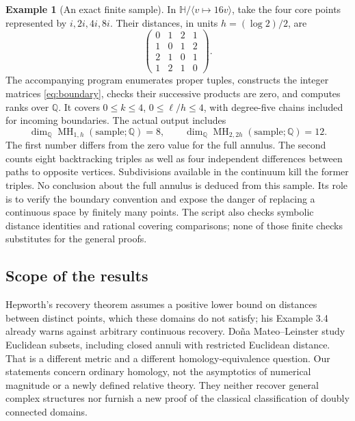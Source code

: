 \documentclass[12pt]{amsart}
\theoremstyle{definition}
\newtheorem{eg}[thm]{Example}
\theoremstyle{remark}
\numberwithin{equation}{section}
\newcommand{\Q}{\mathbb{Q}}
\DeclareMathOperator{\MH}{MH}
\begin{document}
\begin{eg}[An exact finite sample]\label{eg:finite}
In $\mathbb H/\langle v\mapsto16v\rangle$, take the four core points represented by $i,2i,4i,8i$. Their distances, in units $h=(\log2)/2$, are
\[
 \begin{pmatrix}0&1&2&1\\1&0&1&2\\2&1&0&1\\1&2&1&0\end{pmatrix}.
\]
The accompanying program enumerates proper tuples, constructs the integer matrices \eqref{eq:boundary}, checks their successive products are zero, and computes ranks over $\Q$. It covers $0\le k\le4$, $0\le\ell/h\le4$, with degree-five chains included for incoming boundaries. The actual output includes
\[
 \dim_{\Q}\MH_{1,h}(\text{sample};\Q)=8,\qquad
 \dim_{\Q}\MH_{2,2h}(\text{sample};\Q)=12.
\]
The first number differs from the zero value for the full annulus. The second counts eight backtracking triples as well as four independent differences between paths to opposite vertices. Subdivisions available in the continuum kill the former triples. No conclusion about the full annulus is deduced from this sample. Its role is to verify the boundary convention and expose the danger of replacing a continuous space by finitely many points. The script also checks symbolic distance identities and rational covering comparisons; none of those finite checks substitutes for the general proofs.
\end{eg}

\subsection*{Scope of the results}
Hepworth's recovery theorem \cite[Theorem 3.1]{Hepworth} assumes a positive lower bound on distances between distinct points, which these domains do not satisfy; his Example 3.4 already warns against arbitrary continuous recovery. Do\~na Mateo--Leinster \cite{DML} study Euclidean subsets, including closed annuli with restricted Euclidean distance. That is a different metric and a different homology-equivalence question. Our statements concern ordinary homology, not the asymptotics of numerical magnitude or a newly defined relative theory. They neither recover general complex structures nor furnish a new proof of the classical classification of doubly connected domains.
\end{document}
